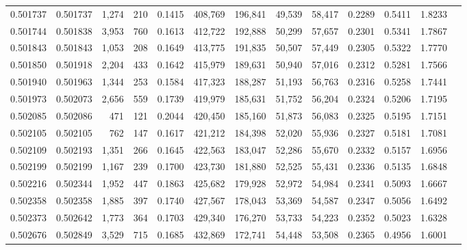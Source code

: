 \begin{tabular}{rrrrrrrrrrrrr}
0.501737 & 0.501737 & 1,274 &   210 &                                     0.1415 & 408,769 & 196,841 &  49,539 &  58,417 & 0.2289 & 0.5411 & 1.8233 \\
0.501744 & 0.501838 & 3,953 &   760 &                                     0.1613 & 412,722 & 192,888 &  50,299 &  57,657 & 0.2301 & 0.5341 & 1.7867 \\
0.501843 & 0.501843 & 1,053 &   208 &                                     0.1649 & 413,775 & 191,835 &  50,507 &  57,449 & 0.2305 & 0.5322 & 1.7770 \\
0.501850 & 0.501918 & 2,204 &   433 &                                     0.1642 & 415,979 & 189,631 &  50,940 &  57,016 & 0.2312 & 0.5281 & 1.7566 \\
0.501940 & 0.501963 & 1,344 &   253 &                                     0.1584 & 417,323 & 188,287 &  51,193 &  56,763 & 0.2316 & 0.5258 & 1.7441 \\
0.501973 & 0.502073 & 2,656 &   559 &                                     0.1739 & 419,979 & 185,631 &  51,752 &  56,204 & 0.2324 & 0.5206 & 1.7195 \\
0.502085 & 0.502086 &   471 &   121 &                                     0.2044 & 420,450 & 185,160 &  51,873 &  56,083 & 0.2325 & 0.5195 & 1.7151 \\
0.502105 & 0.502105 &   762 &   147 &                                     0.1617 & 421,212 & 184,398 &  52,020 &  55,936 & 0.2327 & 0.5181 & 1.7081 \\
0.502109 & 0.502193 & 1,351 &   266 &                                     0.1645 & 422,563 & 183,047 &  52,286 &  55,670 & 0.2332 & 0.5157 & 1.6956 \\
0.502199 & 0.502199 & 1,167 &   239 &                                     0.1700 & 423,730 & 181,880 &  52,525 &  55,431 & 0.2336 & 0.5135 & 1.6848 \\
0.502216 & 0.502344 & 1,952 &   447 &                                     0.1863 & 425,682 & 179,928 &  52,972 &  54,984 & 0.2341 & 0.5093 & 1.6667 \\
0.502358 & 0.502358 & 1,885 &   397 &                                     0.1740 & 427,567 & 178,043 &  53,369 &  54,587 & 0.2347 & 0.5056 & 1.6492 \\
0.502373 & 0.502642 & 1,773 &   364 &                                     0.1703 & 429,340 & 176,270 &  53,733 &  54,223 & 0.2352 & 0.5023 & 1.6328 \\
0.502676 & 0.502849 & 3,529 &   715 &                                     0.1685 & 432,869 & 172,741 &  54,448 &  53,508 & 0.2365 & 0.4956 & 1.6001 \\

\end{tabular}
